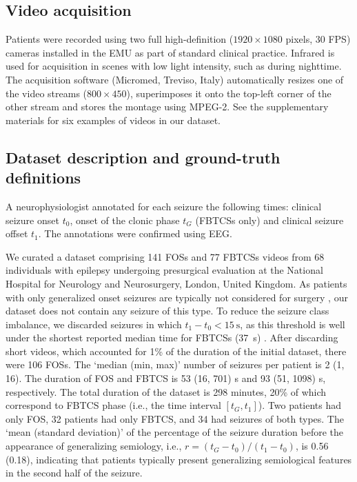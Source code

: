 \subsection{Video acquisition}

Patients were recorded using two full high-definition ($1920 \times 1080$ pixels, 30 \ac{FPS}) cameras installed in the \ac{EMU} as part of standard clinical practice.
Infrared is used for acquisition in scenes with low light intensity, such as during nighttime.
The acquisition software (Micromed, Treviso, Italy) automatically resizes one of the video streams ($800 \times 450$), superimposes it onto the top-left corner of the other stream and stores the montage using MPEG-2.
See the supplementary materials for six examples of videos in our dataset.


\subsection{Dataset description and ground-truth definitions}
\label{sec:dataset}

A neurophysiologist annotated for each seizure the following times: clinical seizure onset $t_0$, onset of the clonic phase $t_G$ (\acp{FBTCS} only) and clinical seizure offset $t_1$.
The annotations were confirmed using \ac{EEG}.

We curated a dataset comprising 141 \acp{FOS} and 77 \acp{FBTCS} videos from 68 individuals with epilepsy undergoing presurgical evaluation at the National Hospital for Neurology and Neurosurgery, London, United Kingdom.
As patients with only generalized onset seizures are typically not considered for surgery \cite{duncan_brain_2016}, our dataset does not contain any seizure of this type.  %
To reduce the seizure class imbalance, we discarded seizures in which $t_1 - t_0 < \SI{15}{\second}$, as this threshold is well under the shortest reported median time for \acp{FBTCS} (\SI{37}{\second}) \cite{jenssen_how_2006}.
After discarding short videos, which accounted for 1\% of the duration of the initial dataset, there were 106 \acp{FOS}.
The `median (min, max)' number of seizures per patient is 2 (1, 16).
The duration of \ac{FOS} and \ac{FBTCS} is 53 (16, 701) s and 93 (51, 1098) s, respectively.
The total duration of the dataset is 298 minutes, 20\% of which correspond to \ac{FBTCS} phase (i.e., the time interval $[t_G, t_1]$).
Two patients had only \ac{FOS}, 32 patients had only \ac{FBTCS}, and 34 had seizures of both types.
The `mean (standard deviation)' of the percentage of the seizure duration before the appearance of generalizing semiology, i.e., $r = (t_G - t_0) / (t_1 - t_0)$, is 0.56 (0.18), indicating that patients typically present generalizing semiological features in the second half of the seizure.

